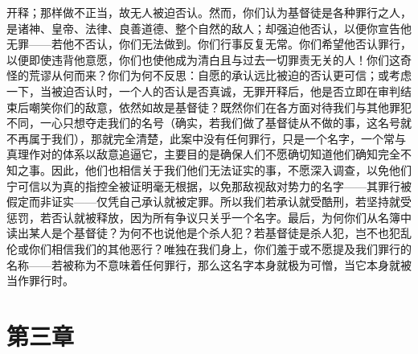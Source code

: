 开释；那样做不正当，故无人被迫否认。然而，你们认为基督徒是各种罪行之人，是诸神、皇帝、法律、良善道德、整个自然的敌人；却强迫他否认，以便你宣告他无罪——若他不否认，你们无法做到。你们行事反复无常。你们希望他否认罪行，以便即使违背他意愿，你们也使他成为清白且与过去一切罪责无关的人！你们这奇怪的荒谬从何而来？你们为何不反思：自愿的承认远比被迫的否认更可信；或考虑一下，当被迫否认时，一个人的否认是否真诚，无罪开释后，他是否立即在审判结束后嘲笑你们的敌意，依然如故是基督徒？既然你们在各方面对待我们与其他罪犯不同，一心只想夺走我们的名号（确实，若我们做了基督徒从不做的事，这名号就不再属于我们），那就完全清楚，此案中没有任何罪行，只是一个名字，一个常与真理作对的体系以敌意追逼它，主要目的是确保人们不愿确切知道他们确知完全不知之事。因此，他们也相信关于我们他们无法证实的事，不愿深入调查，以免他们宁可信以为真的指控全被证明毫无根据，以免那敌视敌对势力的名字——其罪行被假定而非证实——仅凭自己承认就被定罪。所以我们若承认就受酷刑，若坚持就受惩罚，若否认就被释放，因为所有争议只关乎一个名字。最后，为何你们从名簿中读出某人是个基督徒？为何不也说他是个杀人犯？若基督徒是杀人犯，岂不也犯乱伦或你们相信我们的其他恶行？唯独在我们身上，你们羞于或不愿提及我们罪行的名称——若被称为不意味着任何罪行，那么这名字本身就极为可憎，当它本身就被当作罪行时。\par


\section{第三章}

